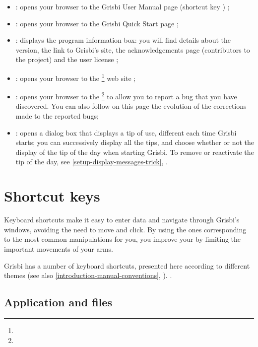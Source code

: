 \begin{itemize}
	\item {} : opens your browser to the \og Grisbi User Manual page \fg{} (shortcut key  ) ;
	\item {} : opens your browser to the \og Grisbi Quick Start page \fg{} ;
	\item {} : displays the program information box: you will find details about the version, the link to Grisbi's site, the acknowledgements page (contributors to the project) and the user license ;
	\item {} : opens your browser to the \footnote{\urlGrisbi{}} web site ;
	\item {} : opens your browser to the \footnote{\urlBugTracker{}} to allow you to report a bug that you have discovered. You can also follow on this page the evolution of the corrections made to the reported bugs;
	\item {} : opens a dialog box that displays a tip of use, different each time Grisbi starts; you can successively display all the tips, and choose whether or not the display of the tip of the day when starting Grisbi. To remove or reactivate the tip of the day, see \vref{setup-display-messages-trick}, .
\end{itemize}


\section{Shortcut keys\label{home-shortcuts}}


Keyboard shortcuts make it easy to enter data and navigate through Grisbi's windows, avoiding the need to move and click. By using the ones corresponding to the most common manipulations for you, you improve your  by limiting the important movements of your arms.
 
Grisbi has a number of keyboard shortcuts, presented here according to different themes (see also  \vref{introduction-manual-conventions}, ).
.

\subsection{Application and files}

